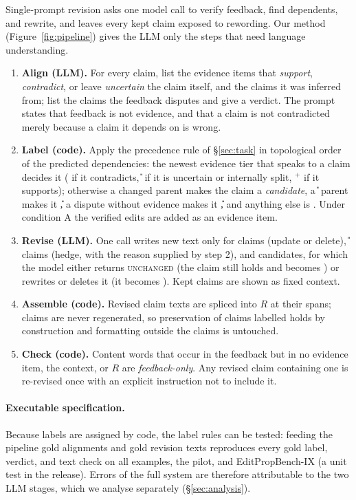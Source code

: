 Single-prompt revision asks one model call to verify feedback, find dependents, and rewrite, and leaves every kept claim exposed to rewording. Our method (Figure~\ref{fig:pipeline}) gives the LLM only the steps that need language understanding.
\begin{enumerate}\itemsep0pt
  \item \textbf{Align (LLM).} For every claim, list the evidence items that \emph{support}, \emph{contradict}, or leave \emph{uncertain} the claim itself, and the claims it was inferred from; list the claims the feedback disputes and give a verdict. The prompt states that feedback is not evidence, and that a claim is not contradicted merely because a claim it depends on is wrong.
  \item \textbf{Label (code).} Apply the precedence rule of \S\ref{sec:task} in topological order of the predicted dependencies: the newest evidence tier that speaks to a claim decides it (\D{} if it contradicts, \U{} if it is uncertain or internally split, \K$^{+}$ if it supports); otherwise a changed parent makes the claim a \Pp{} \emph{candidate}, a \U{} parent makes it \U, a dispute without evidence makes it \U, and anything else is \K. Under condition A the verified edits are added as an evidence item.
  \item \textbf{Revise (LLM).} One call writes new text only for \D{} claims (update or delete), \U{} claims (hedge, with the reason supplied by step 2), and \Pp{} candidates, for which the model either returns \textsc{unchanged} (the claim still holds and becomes \K) or rewrites or deletes it (it becomes \Pp). Kept claims are shown as fixed context.
  \item \textbf{Assemble (code).} Revised claim texts are spliced into $R$ at their spans; \K{} claims are never regenerated, so preservation of claims labelled \K{} holds by construction and formatting outside the claims is untouched.
  \item \textbf{Check (code).} Content words that occur in the feedback but in no evidence item, the context, or $R$ are \emph{feedback-only}. Any revised claim containing one is re-revised once with an explicit instruction not to include it.
\end{enumerate}

\paragraph{Executable specification.} Because labels are assigned by code, the label rules can be tested: feeding the pipeline gold alignments and gold revision texts reproduces every gold label, verdict, and text check on all \ms{} examples, the pilot, and EditPropBench-IX (a unit test in the release). Errors of the full system are therefore attributable to the two LLM stages, which we analyse separately (\S\ref{sec:analysis}).

